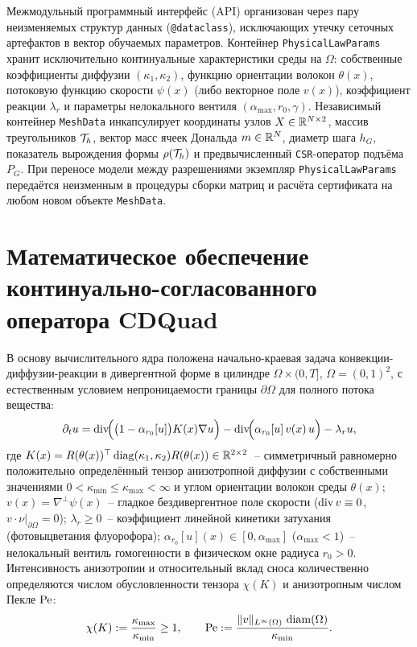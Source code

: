 Межмодульный программный интерфейс (API) организован через пару неизменяемых структур данных (\texttt{@dataclass}), исключающих утечку сеточных артефактов в вектор обучаемых параметров. Контейнер \texttt{PhysicalLawParams} хранит исключительно континуальные характеристики среды на $\Omega$: собственные коэффициенты диффузии $(\kappa_1,\kappa_2)$, функцию ориентации волокон $\theta(x)$, потоковую функцию скорости $\psi(x)$ (либо векторное поле $v(x)$), коэффициент реакции $\lambda_r$ и параметры нелокального вентиля $(\alpha_{\max}, r_0, \gamma)$. Независимый контейнер \texttt{MeshData} инкапсулирует координаты узлов $X\in\mathbb{R}^{N\times 2}$, массив треугольников $\mathcal{T}_h$, вектор масс ячеек Дональда $m\in\mathbb{R}^N$, диаметр шага $h_G$, показатель вырождения формы $\rho(\mathcal{T}_h)$ и предвычисленный \texttt{CSR}-оператор подъёма $P_G$. При переносе модели между разрешениями экземпляр \texttt{PhysicalLawParams} передаётся неизменным в процедуры сборки матриц и расчёта сертификата на любом новом объекте \texttt{MeshData}.

\section{Математическое обеспечение континуально-согласованного оператора CDQuad}

В основу вычислительного ядра положена начально-краевая задача конвекции-диффузии-реакции в дивергентной форме в цилиндре $\Omega\times(0,T]$, $\Omega=(0,1)^2$, с естественным условием непроницаемости границы $\partial\Omega$ для полного потока вещества:
\begin{equation}\label{eq:oit_pde}
\partial_t u = \operatorname{div}\!\Bigl(\bigl(1-\alpha_{r_0}[u]\bigr)K(x)\nabla u\Bigr) - \operatorname{div}\!\Bigl(\alpha_{r_0}[u]\,v(x)\,u\Bigr) - \lambda_r u,
\end{equation}
где $K(x)=R(\theta(x))^\top\operatorname{diag}(\kappa_1,\kappa_2)R(\theta(x))\in\mathbb{R}^{2\times 2}$~-- симметричный равномерно положительно определённый тензор анизотропной диффузии с собственными значениями $0<\kappa_{\min}\le\kappa_{\max}<\infty$ и углом ориентации волокон среды $\theta(x)$; $v(x)=\nabla^\perp\psi(x)$~-- гладкое бездивергентное поле скорости ($\operatorname{div} v\equiv 0$, $v\cdot\nu|_{\partial\Omega}=0$); $\lambda_r\ge 0$~-- коэффициент линейной кинетики затухания (фотовыцветания флуорофора); $\alpha_{r_0}[u](x)\in[0,\alpha_{\max}]$ ($\alpha_{\max}<1$)~-- нелокальный вентиль гомогенности в физическом окне радиуса $r_0>0$. Интенсивность анизотропии и относительный вклад сноса количественно определяются числом обусловленности тензора $\chi(K)$ и анизотропным числом Пекле $\operatorname{Pe}$:
\begin{equation}\label{eq:oit_peclet}
\chi(K) := \frac{\kappa_{\max}}{\kappa_{\min}} \ge 1, \qquad \operatorname{Pe} := \frac{\|v\|_{L^\infty(\Omega)}\,\operatorname{diam}(\Omega)}{\kappa_{\min}}.
\end{equation}

